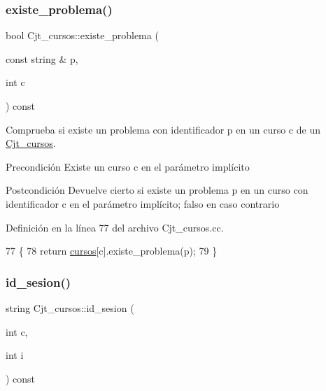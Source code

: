\subsubsection{\texorpdfstring{existe\+\_\+problema()}{existe\_problema()}}
{\footnotesize\ttfamily bool Cjt\+\_\+cursos\+::existe\+\_\+problema (\begin{DoxyParamCaption}\item[{const string \&}]{p,  }\item[{int}]{c }\end{DoxyParamCaption}) const}



Comprueba si existe un problema con identificador p en un curso c de un \mbox{\hyperlink{class_cjt__cursos}{Cjt\+\_\+cursos}}. 

\begin{DoxyPrecond}{Precondición}
Existe un curso c en el parámetro implícito 
\end{DoxyPrecond}
\begin{DoxyPostcond}{Postcondición}
Devuelve cierto si existe un problema p en un curso con identificador c en el parámetro implícito; falso en caso contrario 
\end{DoxyPostcond}


Definición en la línea 77 del archivo Cjt\+\_\+cursos.\+cc.


\begin{DoxyCode}
77                                                                  \{
78       \textcolor{keywordflow}{return} \mbox{\hyperlink{class_cjt__cursos_a582f9540bc295212450dba4cd18c8886}{cursos}}[c].existe\_problema(p);
79     \}
\end{DoxyCode}
\mbox{\label{class_cjt__cursos_acbc9b738ae2d1ba8ba2633aa57561fcb}} 
\subsubsection{\texorpdfstring{id\+\_\+sesion()}{id\_sesion()}}
{\footnotesize\ttfamily string Cjt\+\_\+cursos\+::id\+\_\+sesion (\begin{DoxyParamCaption}\item[{int}]{c,  }\item[{int}]{i }\end{DoxyParamCaption}) const}



